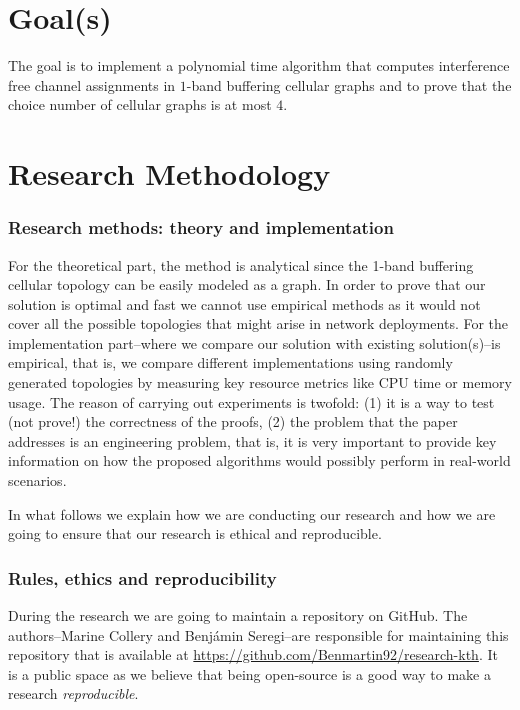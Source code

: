 \documentclass[letterpaper, 10 pt, conference]{ieeeconf}  %
\begin{document}
\section{Goal(s)}


The goal is to implement a polynomial time algorithm that computes interference free channel assignments in $1$-band buffering cellular graphs and to prove that the choice number of cellular graphs is at most $4$.

\section{Research Methodology}
\subsubsection*{Research methods: theory and implementation}
For the theoretical part, the method is analytical since the 1-band buffering cellular topology can be easily modeled as a graph. In order
to prove that our solution is optimal and fast we cannot use empirical methods as it would not cover all the possible
topologies that might arise in network deployments. For the implementation part\---where we compare our solution with existing solution(s)\---is empirical, that is, we compare different implementations using randomly generated topologies by measuring key resource metrics like CPU time or memory usage. The reason of carrying out experiments is twofold: (1) it is a way to test (not prove!) the correctness of the proofs, (2) the problem that the paper addresses is an engineering problem, that is, it is very important to provide key information on how the proposed algorithms would possibly perform in real-world scenarios.

In what follows we explain how we are conducting our research and how we are going to ensure that our research is ethical and reproducible.
\subsubsection*{Rules, ethics and reproducibility}
During the research we are going to maintain a repository on GitHub. The authors\---Marine Collery and Benjámin Seregi\---are responsible for maintaining this repository that is available at \url{https://github.com/Benmartin92/research-kth}. It is a public space as we believe that being open-source is a good way to make a research \textit{reproducible}.
\end{document}
